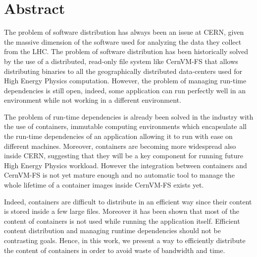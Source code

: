 \begingroup
\let\clearpage\relax
\let\cleardoublepage\relax
\let\cleardoublepage\relax

\chapter*{Abstract} 

The problem of software distribution has always been an issue at CERN, given
the massive dimension of the software used for analyzing the data they collect
from the LHC. The problem of software distribution has been historically solved
by the use of a distributed, read-only file system like CernVM-FS that allows
distributing binaries to all the geographically distributed data-centers used
for High Energy Physics computation. However, the problem of managing run-time
dependencies is still open, indeed, some application can run perfectly well in
an environment while not working in a different environment.

The problem of run-time dependencies is already been solved in the industry
with the use of containers, immutable computing environments which encapsulate
all the run-time dependencies of an application allowing it to run with ease on
different machines. Moreover, containers are becoming more widespread also
inside CERN, suggesting that they will be a key component for running future
High Energy Physics workload. However the integration between containers and
CernVM-FS is not yet mature enough and no automatic tool to manage the whole
lifetime of a container images inside CernVM-FS exists yet.

Indeed, containers are difficult to distribute in an efficient way since their
content is stored inside a few large files. Moreover it has been shown that
most of the content of containers is not used while running the application
itself. Efficient content distribution and managing runtime dependencies should
not be contrasting goals. Hence, in this work, we present a way to efficiently
distribute the content of containers in order to avoid waste of bandwidth and
time.

\newpage

